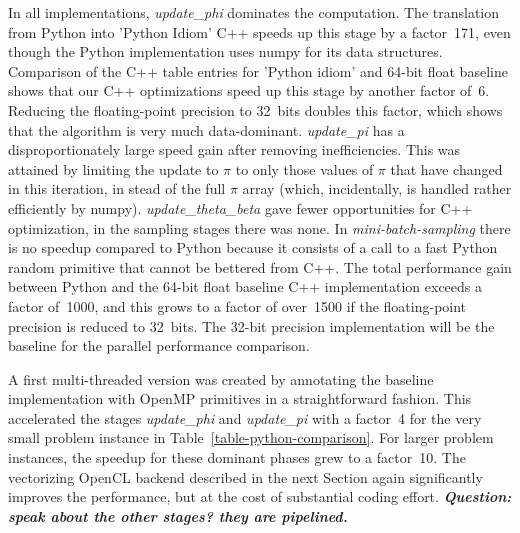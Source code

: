 In all implementations, \textit{update\_phi} dominates the computation.
The translation from Python into 'Python Idiom' C++ speeds up this stage
by a factor~171, even though the Python implementation uses numpy for its data
structures. Comparison of the C++ table entries for 'Python idiom' and
64-bit float baseline shows that our C++ optimizations speed up this stage
by another factor of~6. Reducing the floating-point precision to 32~bits
doubles this factor, which shows that the algorithm is very much data-dominant.
%
\textit{update\_pi} has a disproportionately large speed
gain after removing inefficiencies. This was attained by limiting the
update to $\pi$ to only those values of $\pi$ that have changed in this
iteration, in stead of the full $\pi$ array (which, incidentally, is handled
rather efficiently by numpy).
\textit{update\_theta\_beta} gave fewer opportunities for C++ optimization,
in the sampling stages there was none. In \textit{mini-batch-sampling} there
is no speedup compared to Python because it consists of a call to
a fast Python random primitive that cannot be bettered from C++.
The total performance gain between Python and the 64-bit float baseline C++
implementation exceeds a factor of~1000, and this grows to a factor of over~1500
if the floating-point precision is reduced to 32~bits. The 32-bit precision
implementation will be the baseline for the parallel performance comparison.

A first multi-threaded version was created by annotating the
baseline implementation with OpenMP primitives in a straightforward
fashion. This accelerated the stages \textit{update\_phi} and
\textit{update\_pi} with a factor~4 for the very small problem instance
in Table~\ref{table-python-comparison}. For larger problem instances, the
speedup for these dominant phases grew to a factor~10. The vectorizing OpenCL
backend described in the next Section again significantly improves the
performance, but at the cost of substantial coding effort.
\textbf{\emph{Question: speak about the other stages? they are pipelined.}}

\begin{comment}
The introduction of a custom user-space random generator brings at most
a very small
benefit. We show it, because it is necessary for the multi-threaded
implementations described in the next section, and this measurement serves to
prove that it does not harm execution speed.
\end{comment}
